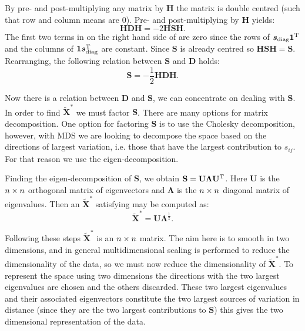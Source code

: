 By pre- and post-multiplying any matrix by $\mathbf{H}$ the matrix is double centred (such that row and column means are 0). Pre- and post-multiplying  by $\mathbf{H}$ yields:
\begin{equation}
\mathbf{H}\mathbf{D}\mathbf{H} = -2\mathbf{H}\mathbf{S}\mathbf{H}.
\end{equation}
The first two terms in on the right hand side of  are zero since the rows of $\bm{s}_\text{diag}\bm{1}^{\text{T}}$ and the columns of  $\bm{1}\bm{s}_\text{diag}^{\text{T}}$ are constant. Since $\mathbf{S}$ is already centred so $\mathbf{H}\mathbf{S}\mathbf{H}=\mathbf{S}$. Rearranging, the following relation between $\mathbf{S}$ and $\mathbf{D}$ holds:
\begin{equation}
\mathbf{S} = -\frac{1}{2}\mathbf{H}\mathbf{D}\mathbf{H}.
\end{equation}

Now there is a relation between $\mathbf{D}$ and $\mathbf{S}$, we can concentrate on dealing with $\mathbf{S}$. In order to find $\tilde{\mathbf{X}}^{*}$ we must factor $\mathbf{S}$. There are many options for matrix decomposition. One option for factoring $\mathbf{S}$ is to use the Cholesky decomposition, however, with MDS we are looking to decompose the space based on the directions of largest variation, i.e. those that have the largest contribution to $s_{ij}$. For that reason we use the eigen-decomposition.

Finding the eigen-decomposition of $\mathbf{S}$, we obtain $\mathbf{S}=\mathbf{U}\mathbf{\Lambda}\mathbf{U}^{\text{T}}$. Here $\mathbf{U}$ is the $n \times n$ orthogonal matrix of eigenvectors and $\mathbf{\Lambda}$ is the $n \times n$ diagonal matrix of eigenvalues. Then an $\tilde{\mathbf{X}}^*$ satisfying  may be computed as:
\begin{equation}
\tilde{\mathbf{X}}^*=\mathbf{U}\mathbf{\Lambda}^{\frac{1}{2}}.
\end{equation}

Following these steps $\tilde{\mathbf{X}}^*$ is an $n \times n$ matrix. The aim here is to smooth in two dimensions, and in general multidimensional scaling is performed to reduce the dimensionality of the data, so we must now reduce the dimensionality of $\tilde{\mathbf{X}}^*$. To represent the space using two dimensions the directions with the two largest eigenvalues are chosen and the others discarded. These two largest eigenvalues and their associated eigenvectors constitute the two largest sources of variation in distance (since they are the two largest contributions to $\mathbf{S}$) this gives the two dimensional representation of the data. 

